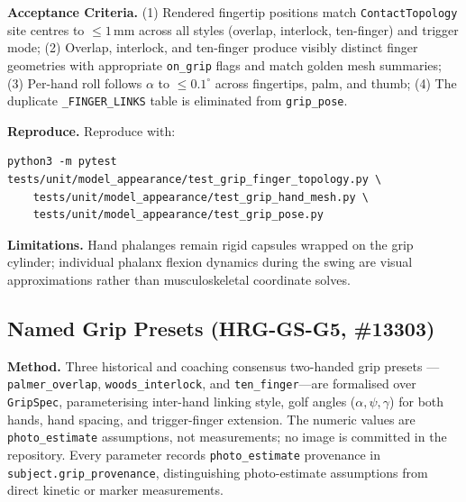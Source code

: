 \documentclass[11pt,a4paper]{article}
\begin{document}
\textbf{Acceptance Criteria.} (1) Rendered fingertip positions match \texttt{ContactTopology} site centres to $\le 1$\,mm across all styles (overlap, interlock, ten-finger) and trigger mode; (2) Overlap, interlock, and ten-finger produce visibly distinct finger geometries with appropriate \texttt{on\_grip} flags and match golden mesh summaries; (3) Per-hand roll follows $\alpha$ to $\le 0.1^\circ$ across fingertips, palm, and thumb; (4) The duplicate \texttt{\_FINGER\_LINKS} table is eliminated from \texttt{grip\_pose}.

\textbf{Reproduce.} Reproduce with:
\begin{verbatim}
python3 -m pytest tests/unit/model_appearance/test_grip_finger_topology.py \
    tests/unit/model_appearance/test_grip_hand_mesh.py \
    tests/unit/model_appearance/test_grip_pose.py
\end{verbatim}

\textbf{Limitations.} Hand phalanges remain rigid capsules wrapped on the grip cylinder; individual phalanx flexion dynamics during the swing are visual approximations rather than musculoskeletal coordinate solves.

\subsection{Named Grip Presets (HRG-GS-G5, \#13303)}
\textbf{Method.} Three historical and coaching consensus two-handed grip presets
---\texttt{palmer\_overlap}, \texttt{woods\_interlock}, and
\texttt{ten\_finger}---are formalised over \texttt{GripSpec}, parameterising
inter-hand linking style, golf angles ($\alpha, \psi, \gamma$) for both hands,
hand spacing, and trigger-finger extension. The numeric values are
\texttt{photo\_estimate} assumptions, not measurements; no image is committed
in the repository. Every parameter records \texttt{photo\_estimate} provenance
in \texttt{subject.grip\_provenance}, distinguishing photo-estimate assumptions
from direct kinetic or marker measurements.
\end{document}
